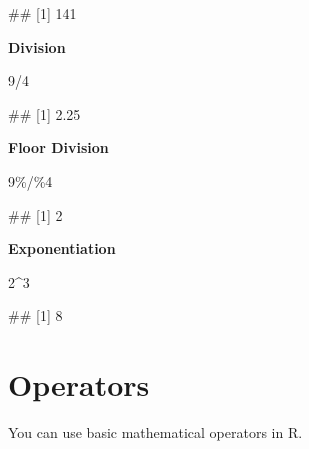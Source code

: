 \documentclass[
]{book}
\newenvironment{Shaded}{\begin{snugshade}}{\end{snugshade}}
\newcommand{\DecValTok}[1]{\textcolor[rgb]{0.00,0.00,0.81}{#1}}
\newcommand{\NormalTok}[1]{#1}
\newcommand{\SpecialCharTok}[1]{\textcolor[rgb]{0.00,0.00,0.00}{#1}}
\begin{document}
\begin{Shaded}
\begin{Highlighting}[]
\NormalTok{\#\# [1] 141}
\end{Highlighting}
\end{Shaded}

\textbf{Division}

\begin{Shaded}
\begin{Highlighting}[]
\DecValTok{9}\SpecialCharTok{/}\DecValTok{4}
\end{Highlighting}
\end{Shaded}

\begin{Shaded}
\begin{Highlighting}[]
\NormalTok{\#\# [1] 2.25}
\end{Highlighting}
\end{Shaded}

\textbf{Floor Division}

\begin{Shaded}
\begin{Highlighting}[]
\DecValTok{9}\SpecialCharTok{\%/\%}\DecValTok{4}
\end{Highlighting}
\end{Shaded}

\begin{Shaded}
\begin{Highlighting}[]
\NormalTok{\#\# [1] 2}
\end{Highlighting}
\end{Shaded}

\textbf{Exponentiation}

\begin{Shaded}
\begin{Highlighting}[]
\DecValTok{2}\SpecialCharTok{\^{}}\DecValTok{3}
\end{Highlighting}
\end{Shaded}

\begin{Shaded}
\begin{Highlighting}[]
\NormalTok{\#\# [1] 8}
\end{Highlighting}
\end{Shaded}

\hypertarget{operators}{%
\section{Operators}\label{operators}}

You can use basic mathematical operators in R.
\end{document}
